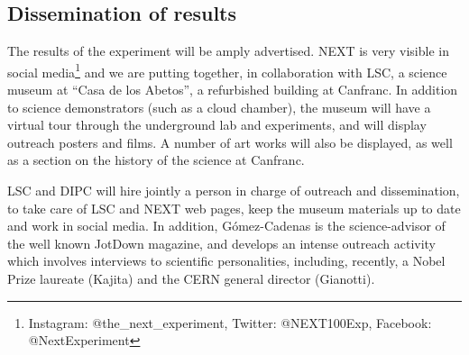 
\subsection{Dissemination of results}

The results of the experiment will be amply advertised. NEXT is very visible in social media\footnote{Instagram: @the\_next\_experiment,
Twitter: @NEXT100Exp,
Facebook: @NextExperiment} and we are putting together, in collaboration with LSC, a science museum at ``Casa de los Abetos'', a refurbished building at Canfranc. In addition to science demonstrators (such as a cloud chamber), the museum will have a virtual tour through the underground lab and experiments, and will display outreach posters and films. A number of art works will also be displayed, as well as a section on the history of the science at Canfranc. 


LSC and DIPC will hire jointly a person in charge of outreach and dissemination, to take care of LSC and NEXT web pages, keep the museum materials up to date and work in social media. In addition, G\'omez-Cadenas
is the science-advisor of the well known JotDown magazine, and develops an intense outreach activity which involves interviews to scientific personalities, including, recently, a Nobel Prize laureate (Kajita) and the CERN general director (Gianotti).

%

